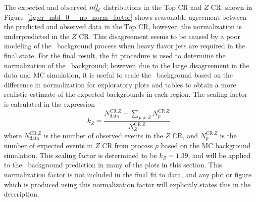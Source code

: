 The expected and observed $m_{b\ell}^{0}$ distributions in the Top CR and $Z$ CR,
shown in Figure~\ref{fig:cr_mbl_0__no_norm_factor} shows reasonable agreement
between the predicted and observed data in the Top CR, however, the
normalization is underpredicted in the $Z$ CR.
This disagreement seems to be caused by a poor modeling of the
\ZGAMMAJETS\ background process when heavy flavor jets are required in the
final state.
For the final result, the fit procedure is used to determine the normalization
of the \ZGAMMAJETS\ background; however, due to the large disagreement in the
data and MC simulation, it is useful to scale the \ZGAMMAJETS\ background based
on the difference in normalization for exploratory plots and tables to obtain a
more realistic estimate of the expected backgrounds in each region.
The scaling factor is calculated in the expression
\begin{equation}
  k_Z = \frac{N_\mathrm{data}^{\mathrm{CR}~Z} -
                \sum_{p \neq Z}N_{p}^{\mathrm{CR}~Z} }
             {N_{Z}^{\mathrm{CR}~Z}}
\end{equation}
where $N_\mathrm{data}^{\mathrm{CR}~Z}$ is the number of observed events in
the $Z$ CR, and $N_{p}^{\mathrm{CR}~Z}$ is the number of expected events in
$Z$ CR from process $p$ based on the MC background simulation.
This scaling factor is determined to be $k_Z = 1.39$, and will be applied to
the \ZGAMMAJETS\ background prediction in many of the plots in this section.
This normalization factor is not included in the final fit to data, and any plot
or figure which is produced using this normalization factor will explicitly
states this in the description.


